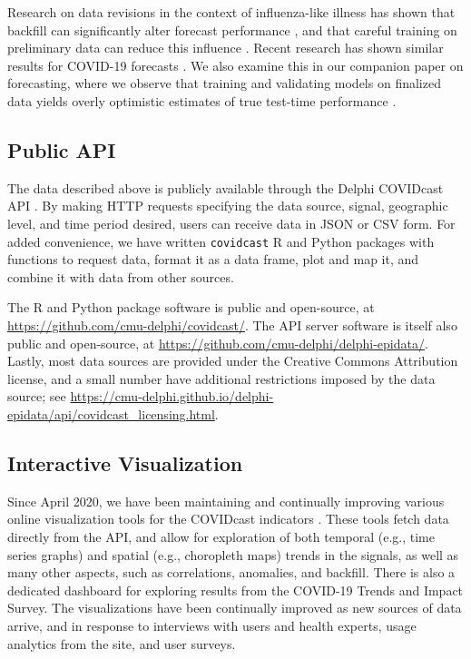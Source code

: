 \documentclass[9pt,twocolumn,twoside,lineno]{pnas-new}
\begin{document}
Research on data revisions in the context of influenza-like illness has shown
that backfill can significantly alter forecast performance \cite{Brooks:2018,
  Reich:2019}, and that careful training on preliminary data can reduce this
influence \cite{Brooks:2020}. Recent research has shown similar results for
COVID-19 forecasts \cite{Kamarthi:2021}. We also examine this in our companion
paper on forecasting, where we observe that training and validating models on
finalized data yields overly optimistic estimates of true test-time
performance \cite{McDonald:2021}.

\subsection{Public API}

The data described above is publicly available through the Delphi COVIDcast API
\cite{CovidcastAPI}.  By making HTTP requests specifying the data source,
signal, geographic level, and time period desired, users can receive data in
JSON or CSV form. For added convenience, we have written \texttt{covidcast} R
\cite{CovidcastR} and Python \cite{CovidcastPy} packages with functions to
request data, format it as a data frame, plot and map it, and combine it with
data from other sources.

The R and Python package software is public and open-source, at
\url{https://github.com/cmu-delphi/covidcast/}.  The API server software is
itself also public and open-source, at
\url{https://github.com/cmu-delphi/delphi-epidata/}.  Lastly, most data sources
are provided under the Creative Commons Attribution license, and a small number
have additional restrictions imposed by the data source; see
\url{https://cmu-delphi.github.io/delphi-epidata/api/covidcast_licensing.html}.

\subsection{Interactive Visualization}

Since April 2020, we have been maintaining and continually improving various
online visualization tools for the COVIDcast indicators \cite{CovidcastViz}.
These tools fetch data directly from the API, and allow for exploration of both
temporal (e.g., time series graphs) and spatial (e.g., choropleth maps) trends
in the signals, as well as many other aspects, such as correlations, anomalies,
and backfill. There is also a dedicated dashboard for exploring results from the
COVID-19 Trends and Impact Survey. The visualizations have been continually
improved as new sources of data arrive, and in response to interviews with users
and health experts, usage analytics from the site, and user surveys.%
\end{document}
